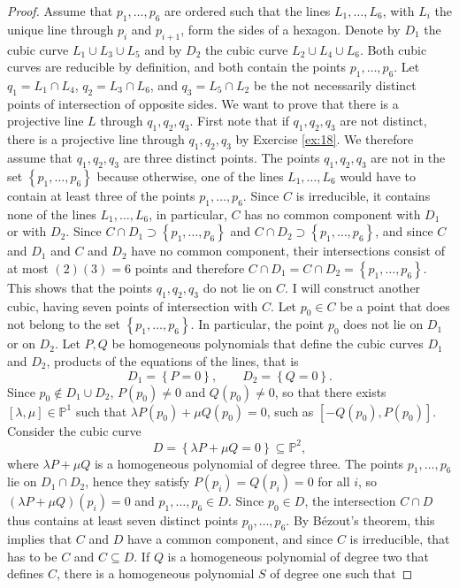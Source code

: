 \documentclass{article}
\renewcommand{\P}{\mathbb{P}}
\newcommand{\rb}[1]{\left( #1 \right)}
\renewcommand{\sb}[1]{\left[ #1 \right]}
\newcommand{\cb}[1]{\left\{ #1 \right\}}
\theoremstyle{definition}\newtheorem{definition}{Definition}[section]
\theoremstyle{definition}\newtheorem{notation}[definition]{Notation}
\theoremstyle{definition}\newtheorem{remark}[definition]{Remark}
\theoremstyle{definition}\newtheorem{example}[definition]{Example}
\theoremstyle{definition}\newtheorem{fact}{Fact}
\theoremstyle{definition}\newtheorem{exercise}{Exercise}
\begin{document}
\begin{proof}
Assume that $ p_1, \dots, p_6 $ are ordered such that the lines $ L_1, \dots, L_6 $, with $ L_i $ the unique line through $ p_i $ and $ p_{i + 1} $, form the sides of a hexagon. Denote by $ D_1 $ the cubic curve $ L_1 \cup L_3 \cup L_5 $ and by $ D_2 $ the cubic curve $ L_2 \cup L_4 \cup L_6 $. Both cubic curves are reducible by definition, and both contain the points $ p_1, \dots, p_6 $. Let $ q_1 = L_1 \cap L_4 $, $ q_2 = L_3 \cap L_6 $, and $ q_3 = L_5 \cap L_2 $ be the not necessarily distinct points of intersection of opposite sides. We want to prove that there is a projective line $ L $ through $ q_1, q_2, q_3 $. First note that if $ q_1, q_2, q_3 $ are not distinct, there is a projective line through $ q_1, q_2, q_3 $ by Exercise \ref{ex:18}. We therefore assume that $ q_1, q_2, q_3 $ are three distinct points. The points $ q_1, q_2, q_3 $ are not in the set $ \cb{p_1, \dots, p_6} $ because otherwise, one of the lines $ L_1, \dots, L_6 $ would have to contain at least three of the points $ p_1, \dots, p_6 $. Since $ C $ is irreducible, it contains none of the lines $ L_1, \dots, L_6 $, in particular, $ C $ has no common component with $ D_1 $ or with $ D_2 $. Since $ C \cap D_1 \supset \cb{p_1, \dots, p_6} $ and $ C \cap D_2 \supset \cb{p_1, \dots, p_6} $, and since $ C $ and $ D_1 $ and $ C $ and $ D_2 $ have no common component, their intersections consist of at most $ \rb{2}\rb{3} = 6 $ points and therefore $ C \cap D_1 = C \cap D_2 = \cb{p_1, \dots, p_6} $. This shows that the points $ q_1, q_2, q_3 $ do not lie on $ C $. I will construct another cubic, having seven points of intersection with $ C $. Let $ p_0 \in C $ be a point that does not belong to the set $ \cb{p_1, \dots, p_6} $. In particular, the point $ p_0 $ does not lie on $ D_1 $ or on $ D_2 $. Let $ P, Q $ be homogeneous polynomials that define the cubic curves $ D_1 $ and $ D_2 $, products of the equations of the lines, that is
$$ D_1 = \cb{P = 0}, \qquad D_2 = \cb{Q = 0}. $$
Since $ p_0 \notin D_1 \cup D_2 $, $ P\rb{p_0} \ne 0 $ and $ Q\rb{p_0} \ne 0 $, so that there exists $ \sb{\lambda, \mu} \in \P^1 $ such that $ \lambda P\rb{p_0} + \mu Q\rb{p_0} = 0 $, such as $ \sb{-Q\rb{p_0}, P\rb{p_0}} $. Consider the cubic curve
$$ D = \cb{\lambda P + \mu Q = 0} \subseteq \P^2, $$
where $ \lambda P + \mu Q $ is a homogeneous polynomial of degree three. The points $ p_1, \dots, p_6 $ lie on $ D_1 \cap D_2 $, hence they satisfy $ P\rb{p_i} = Q\rb{p_i} = 0 $ for all $ i $, so $ \rb{\lambda P + \mu Q}\rb{p_i} = 0 $ and $ p_1, \dots, p_6 \in D $. Since $ p_0 \in D $, the intersection $ C \cap D $ thus contains at least seven distinct points $ p_0, \dots, p_6 $. By Bézout's theorem, this implies that $ C $ and $ D $ have a common component, and since $ C $ is irreducible, that has to be $ C $ and $ C \subseteq D $. If $ Q $ is a homogeneous polynomial of degree two that defines $ C $, there is a homogeneous polynomial $ S $ of degree one such that

\end{proof}
\end{document}
